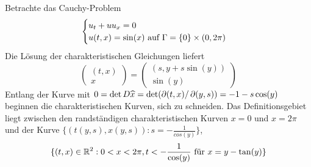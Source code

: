 \begin{bsp} \label{bsp_12}
	Betrachte das Cauchy-Problem \marginnote{[12]}
	\[ \begin{cases}
		u_t + uu_x = 0 \\
		u(t,x) = \sin(x) \text{ auf } \Gamma = \{0\} \times (0,2\pi)
		\end{cases} \]
	Die Lösung der charakteristischen Gleichungen liefert
	\[ \begin{pmatrix} (t,x) \\ x \end{pmatrix} = \begin{pmatrix} (s,y+s \sin(y)) \\ \sin(y) \end{pmatrix} \]
	Entlang der Kurve mit $0 = \det D\widehat{x} = \det(\operatorname{\partial}(t,x)/\operatorname{\partial}(y,s)) = -1 -s \cos(y)$ beginnen die charakteristischen Kurven, sich zu schneiden. Das Definitionsgebiet liegt zwischen den randständigen charakteristischen Kurven $x=0$ und $x=2\pi$ und der Kurve $\{(t(y,s),x(y,s)) : s = -\frac{1}{cos(y)}\}$,
	\[ \{(t,x) \in \mathbb{R}^2 : 0 < x < 2\pi, t < - \frac{1}{\cos(y)} \text{ für } x=y-\tan(y) \} \]
\end{bsp}
\newpage